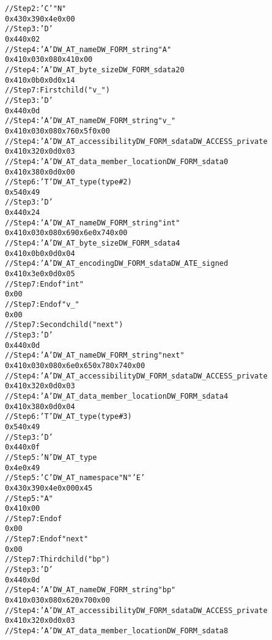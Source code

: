 \begin{alltt}
// Step 2: 'C'  "N"
0x43 0x39 0x4e 0x00
// Step 3: 'D' 
0x44 0x02
// Step 4: 'A' DW\_AT\_name DW\_FORM\_string "A"
0x41 0x03 0x08 0x41 0x00
// Step 4: 'A' DW\_AT\_byte\_size DW\_FORM\_sdata 20
0x41 0x0b 0x0d 0x14
// Step 7: First child ("v\_")
    // Step 3: 'D' 
    0x44 0x0d
    // Step 4: 'A' DW\_AT\_name DW\_FORM\_string "v\_"
    0x41 0x03 0x08 0x76 0x5f 0x00
    // Step 4: 'A' DW\_AT\_accessibility DW\_FORM\_sdata DW\_ACCESS\_private
    0x41 0x32 0x0d 0x03
    // Step 4: 'A' DW\_AT\_data\_member\_location DW\_FORM\_sdata 0
    0x41 0x38 0x0d 0x00
    // Step 6: 'T' DW\_AT\_type (type \#2)
    0x54 0x49
        // Step 3: 'D' 
        0x44 0x24
        // Step 4: 'A' DW\_AT\_name DW\_FORM\_string "int"
        0x41 0x03 0x08 0x69 0x6e 0x74 0x00
        // Step 4: 'A' DW\_AT\_byte\_size DW\_FORM\_sdata 4
        0x41 0x0b 0x0d 0x04
        // Step 4: 'A' DW\_AT\_encoding DW\_FORM\_sdata DW\_ATE\_signed
        0x41 0x3e 0x0d 0x05
        // Step 7: End of  "int"
        0x00
    // Step 7: End of  "v\_"
    0x00
// Step 7: Second child ("next")
    // Step 3: 'D' 
    0x44 0x0d
    // Step 4: 'A' DW\_AT\_name DW\_FORM\_string "next"
    0x41 0x03 0x08 0x6e 0x65 0x78 0x74 0x00
    // Step 4: 'A' DW\_AT\_accessibility DW\_FORM\_sdata DW\_ACCESS\_private
    0x41 0x32 0x0d 0x03
    // Step 4: 'A' DW\_AT\_data\_member\_location DW\_FORM\_sdata 4
    0x41 0x38 0x0d 0x04
    // Step 6: 'T' DW\_AT\_type (type \#3)
    0x54 0x49
        // Step 3: 'D' 
        0x44 0x0f
        // Step 5: 'N' DW\_AT\_type
        0x4e 0x49
        // Step 5: 'C' DW\_AT\_namespace "N" 'E'
        0x43 0x39 0x4e 0x00 0x45
        // Step 5: "A"
        0x41 0x00
        // Step 7: End of 
        0x00
    // Step 7: End of  "next"
    0x00
// Step 7: Third child ("bp")
    // Step 3: 'D' 
    0x44 0x0d
    // Step 4: 'A' DW\_AT\_name DW\_FORM\_string "bp"
    0x41 0x03 0x08 0x62 0x70 0x00
    // Step 4: 'A' DW\_AT\_accessibility DW\_FORM\_sdata DW\_ACCESS\_private
    0x41 0x32 0x0d 0x03
    // Step 4: 'A' DW\_AT\_data\_member\_location DW\_FORM\_sdata 8

\end{alltt}
